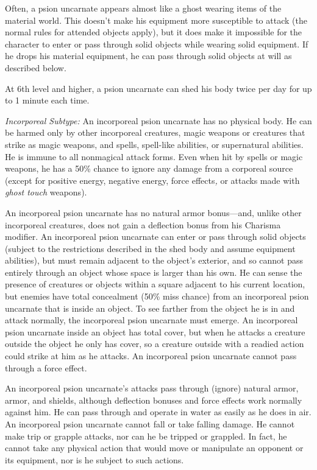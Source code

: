 \documentclass{article}
\begin{document}
Often, a psion uncarnate appears almost like a ghost wearing items of the material 
world. This doesn't make his equipment more susceptible to attack (the normal rules 
for attended objects apply), but it does make it impossible for the character to 
enter or pass through solid objects while wearing solid equipment. If he drops 
his material equipment, he can pass through solid objects at will as described 
below.

At 6th level and higher, a psion uncarnate can shed his body twice per day for 
up to 1 minute each time. 

\textit{Incorporeal Subtype: }An incorporeal psion uncarnate has no physical body. 
He can be harmed only by other incorporeal creatures, magic weapons or creatures 
that strike as magic weapons, and spells, spell-like abilities, or supernatural 
abilities. He is immune to all nonmagical attack forms. Even when hit by spells 
or magic weapons, he has a 50\% chance to ignore any damage from a corporeal source 
(except for positive energy, negative energy, force effects\textit{, }or attacks 
made with \textit{ghost touch }weapons).

An incorporeal psion uncarnate has no natural armor bonus---and, unlike other incorporeal 
creatures, does not gain a deflection bonus from his Charisma modifier. An incorporeal 
psion uncarnate can enter or pass through solid objects (subject to the restrictions 
described in the shed body and assume equipment abilities), but must remain adjacent 
to the object's exterior, and so cannot pass entirely through an object whose space 
is larger than his own. He can sense the presence of creatures or objects within 
a square adjacent to his current location, but enemies have total concealment (50\% 
miss chance) from an incorporeal psion uncarnate that is inside an object. To see 
farther from the object he is in and attack normally, the incorporeal psion uncarnate 
must emerge. An incorporeal psion uncarnate inside an object has total cover, but 
when he attacks a creature outside the object he only has cover, so a creature 
outside with a readied action could strike at him as he attacks. An incorporeal 
psion uncarnate cannot pass through a force effect.

An incorporeal psion uncarnate's attacks pass through (ignore) natural armor, armor, 
and shields, although deflection bonuses and force effects work normally against 
him. He can pass through and operate in water as easily as he does in air. An incorporeal 
psion uncarnate cannot fall or take falling damage. He cannot make trip or grapple 
attacks, nor can he be tripped or grappled. In fact, he cannot take any physical 
action that would move or manipulate an opponent or its equipment, nor is he subject 
to such actions.
\end{document}
